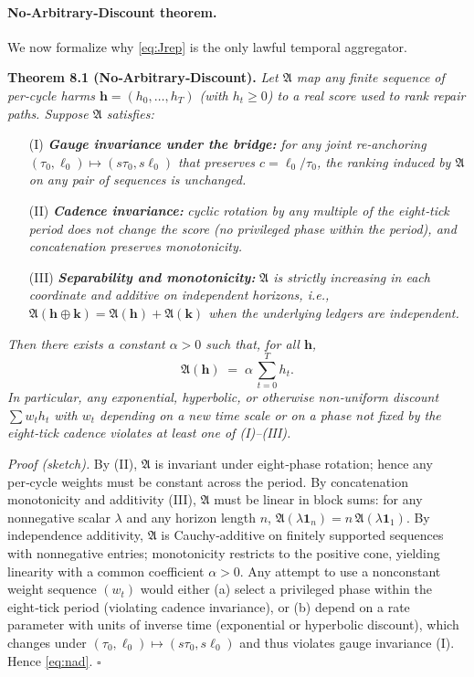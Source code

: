 \documentclass[11pt]{article}
\begin{document}
\paragraph{No‑Arbitrary‑Discount theorem.}
We now formalize why \eqref{eq:Jrep} is the only lawful temporal aggregator.

\medskip
\noindent\textbf{Theorem 8.1 (No‑Arbitrary‑Discount).}
\emph{Let $\mathfrak{A}$ map any finite sequence of per‑cycle harms $\mathbf{h}=(h_0,\dots,h_T)$ (with $h_t\ge 0$) to a real score used to rank repair paths. Suppose $\mathfrak{A}$ satisfies:}
\begin{enumerate}
\item[(I)] \emph{\textbf{Gauge invariance under the bridge:}} \emph{for any joint re‑anchoring $(\tau_0,\ell_0)\mapsto(s\tau_0,s\ell_0)$ that preserves $c=\ell_0/\tau_0$, the ranking induced by $\mathfrak{A}$ on any pair of sequences is unchanged.}
\item[(II)] \emph{\textbf{Cadence invariance:}} \emph{cyclic rotation by any multiple of the eight‑tick period does not change the score (no privileged phase within the period), and concatenation preserves monotonicity.}
\item[(III)] \emph{\textbf{Separability and monotonicity:}} \emph{$\mathfrak{A}$ is strictly increasing in each coordinate and additive on independent horizons, i.e., $\mathfrak{A}(\mathbf{h}\oplus \mathbf{k})=\mathfrak{A}(\mathbf{h})+\mathfrak{A}(\mathbf{k})$ when the underlying ledgers are independent.}
\end{enumerate}
\emph{Then there exists a constant $\alpha>0$ such that, for all $\mathbf{h}$,}
\begin{equation}
\mathfrak{A}(\mathbf{h})\;=\;\alpha\,\sum_{t=0}^{T} h_t.
\label{eq:nad}
\end{equation}
\emph{In particular, any exponential, hyperbolic, or otherwise non‑uniform discount $\sum w_t h_t$ with $w_t$ depending on a new time scale or on a phase not fixed by the eight‑tick cadence violates at least one of (I)–(III).}

\medskip
\noindent\emph{Proof (sketch).}
By (II), $\mathfrak{A}$ is invariant under eight‑phase rotation; hence any per‑cycle weights must be constant across the period. By concatenation monotonicity and additivity (III), $\mathfrak{A}$ must be linear in block sums: for any nonnegative scalar $\lambda$ and any horizon length $n$, $\mathfrak{A}(\lambda\mathbf{1}_n)=n\,\mathfrak{A}(\lambda\mathbf{1}_1)$. By independence additivity, $\mathfrak{A}$ is Cauchy‑additive on finitely supported sequences with nonnegative entries; monotonicity restricts to the positive cone, yielding linearity with a common coefficient $\alpha>0$. Any attempt to use a nonconstant weight sequence $(w_t)$ would either (a) select a privileged phase within the eight‑tick period (violating cadence invariance), or (b) depend on a rate parameter with units of inverse time (exponential or hyperbolic discount), which changes under $(\tau_0,\ell_0)\mapsto(s\tau_0,s\ell_0)$ and thus violates gauge invariance (I). Hence \eqref{eq:nad}. \hfill$\square$
\end{document}
